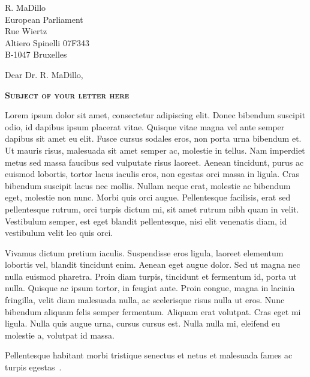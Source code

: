 \documentclass[a4paper,12pt]{letter}
\date{February 31, 2013}
\begin{document}
\begin{letter}{
    R. MaDillo\\
    European Parliament\\
    Rue Wiertz\\
    Altiero Spinelli 07F343\\
    B-1047 Bruxelles 
  }
  \opening{Dear Dr. R. MaDillo,}
{
  \begin{center}
    \textbf{\textsc{Subject of your letter here}}
  \end{center}
}
%
{
  \setlength{\parindent}{0.5cm}
  \setlength{\parskip}{0pt plus 0.1pt}

  Lorem ipsum dolor sit amet, consectetur adipiscing elit. Donec bibendum 
  suscipit odio, id dapibus ipsum placerat vitae. Quisque vitae magna vel ante 
  semper dapibus sit amet eu elit. Fusce cursus sodales eros, non porta urna 
  bibendum et. Ut mauris risus, malesuada sit amet semper ac, molestie in 
  tellus. Nam imperdiet metus sed massa faucibus sed vulputate risus laoreet. 
  Aenean tincidunt, purus ac euismod lobortis, tortor lacus iaculis eros, non 
  egestas orci massa in ligula. Cras bibendum suscipit lacus nec mollis. Nullam 
  neque erat, molestie ac bibendum eget, molestie non nunc. Morbi quis orci 
  augue. Pellentesque facilisis, erat sed pellentesque rutrum, orci turpis 
  dictum mi, sit amet rutrum nibh quam in velit. Vestibulum semper, est eget 
  blandit pellentesque, nisi elit venenatis diam, id vestibulum velit leo quis 
  orci. 
  
  Vivamus dictum pretium iaculis. Suspendisse eros ligula, laoreet elementum 
  lobortis vel, blandit tincidunt enim. Aenean eget augue dolor. Sed ut magna 
  nec nulla euismod pharetra. Proin diam turpis, tincidunt et fermentum id, 
  porta ut nulla. Quisque ac ipsum tortor, in feugiat ante. Proin congue, magna 
  in lacinia fringilla, velit diam malesuada nulla, ac scelerisque risus nulla 
  ut eros. Nunc bibendum aliquam felis semper fermentum. Aliquam erat volutpat. 
  Cras eget mi ligula. Nulla quis augue urna, cursus cursus est. Nulla nulla mi, 
  eleifend eu molestie a, volutpat id massa. 
  
  Pellentesque habitant morbi tristique senectus et netus et malesuada fames ac 
  turpis egestas~.

}
\end{letter}
\end{document}
